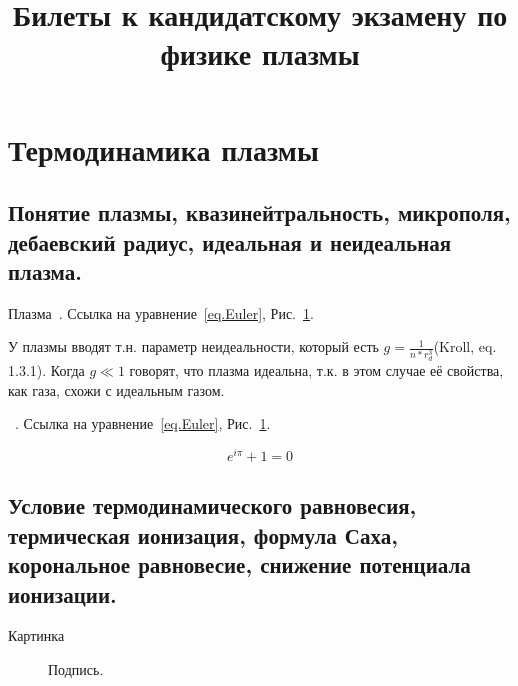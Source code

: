\documentclass[10pt, a4paper]{article}
\title{Билеты к кандидатскому экзамену по физике плазмы}
\date{}
\begin{document}
\newpage
\section{Термодинамика плазмы}
\label{sec.1}

\subsection{Понятие плазмы, квазинейтральность, микрополя, дебаевский радиус, идеальная и неидеальная плазма.}
\label{sec.1.1}

Плазма~\cite{kotelnikov}. Ссылка на уравнение~\eqref{eq.Euler}, Рис.~\ref{fig.1.2.1}.

У плазмы вводят т.н. параметр неидеальности, который есть $g = \frac{1}{n * r_d^3}$(Kroll, eq. 1.3.1). Когда 
$g \ll 1$ говорят, что плазма идеальна, т.к. в этом случае её свойства, как газа, схожи с идеальным газом.





~\cite{kotelnikov}. Ссылка на уравнение~\eqref{eq.Euler}, Рис.~\ref{fig.1.2.1}.


\begin{equation}
    \label{eq.Euler}
    e^{i \pi} + 1 = 0
\end{equation}

\subsection{Условие термодинамического равновесия, термическая ионизация, формула Саха, корональное равновесие, снижение потенциала ионизации.}
\label{sec.1.2}

Картинка

\begin{figure}[h!]
    \caption{\label{fig.1.2.1} Подпись.}
\end{figure}
\end{document}
